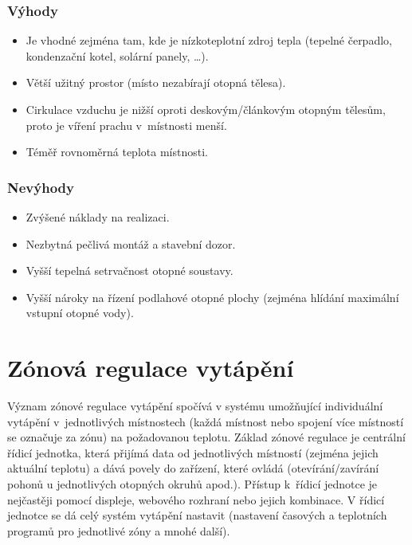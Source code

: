 \subsubsection{Výhody}

\begin{itemize}
  \item Je vhodné zejména tam, kde je nízkoteplotní zdroj tepla (tepelné čerpadlo, kondenzační kotel, solární panely, …).
  \item Větší užitný prostor (místo nezabírají otopná tělesa).
  \item Cirkulace vzduchu je nižší oproti deskovým/článkovým otopným tělesům, proto je víření prachu v~místnosti menší.
  \item Téměř rovnoměrná teplota místnosti.
\end{itemize}

\subsubsection{Nevýhody}

\begin{itemize}
  \item Zvýšené náklady na realizaci.
  \item Nezbytná pečlivá montáž a stavební dozor.
  \item Vyšší tepelná setrvačnost otopné soustavy.
  \item Vyšší nároky na řízení podlahové otopné plochy (zejména hlídání maximální vstupní otopné vody).
\end{itemize}

\section{Zónová regulace vytápění}

Význam zónové regulace vytápění spočívá v systému umožňující individuální vytápění v~jednotlivých místnostech (každá místnost nebo spojení více místností se označuje za zónu) na požadovanou teplotu.  Základ zónové regulace je centrální řídicí jednotka, která přijímá data od jednotlivých místností (zejména jejich aktuální teplotu) a dává povely do zařízení, které ovládá (otevírání/zavírání pohonů u jednotlivých otopných okruhů apod.). Přístup k~řídicí jednotce je nejčastěji pomocí displeje, webového rozhraní nebo jejich kombinace. V řídicí jednotce se dá celý systém vytápění nastavit (nastavení časových a teplotních programů pro jednotlivé zóny a mnohé další). 

